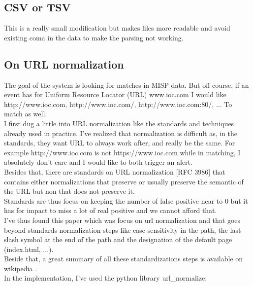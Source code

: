 \documentclass{eplmastersthesis}
\begin{document}
\subsection{CSV or TSV}
This is a really small modification but makes files more readable and avoid existing coma in the data to make the parsing not working.

\subsection{On URL normalization}
The goal of the system is looking for matches in MISP data. But off course, if an event has for Uniform Resource Locator (URL) www.ioc.com I would like http://www.ioc.com, http://www.ioc.com/, http://www.ioc.com:80/, ... To match as well.\\
I first dug a little into URL normalization like the standards and techniques already used in practice. I've realized that normalization is difficult as, in the standards, they want URL to always work after, and really be the same. For example http://www.ioc.com is not https://www.ioc.com while in matching, I absolutely don't care and I would like to both trigger an alert.\\
Besides that, there are standards on URL normalization [RFC 3986] that contains either normalizations that preserve or usually preserve the semantic of the URL but non that does not preserve it.\\
Standards are thus focus on keeping the number of false positive near to 0 but it has for impact to miss a lot of real positive and we cannot afford that.\\
I've thus found this paper \cite{lee2005url} which was focus on url normalization and that goes beyond standards normalization steps like case sensitivity in the path, the last slash symbol at the end of the path and the designation of the default page (index.html, ...).\\
Beside that, a great summary of all these standardizations steps is available on wikipedia \cite{wikiNormalizationURL}.\\
In the implementation, I've used the python library url\_normalize:
\end{document}
